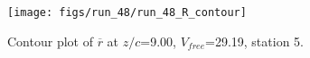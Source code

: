 \begin{figure}[H]
\centering
\texttt{[image: figs/run\_48/run\_48\_R\_contour]}
\caption{Contour plot of $\overline{r}$ at $z/c$=9.00, $V_{free}$=29.19, station 5.}
\label{fig:run_48_R_contour}
\end{figure}


